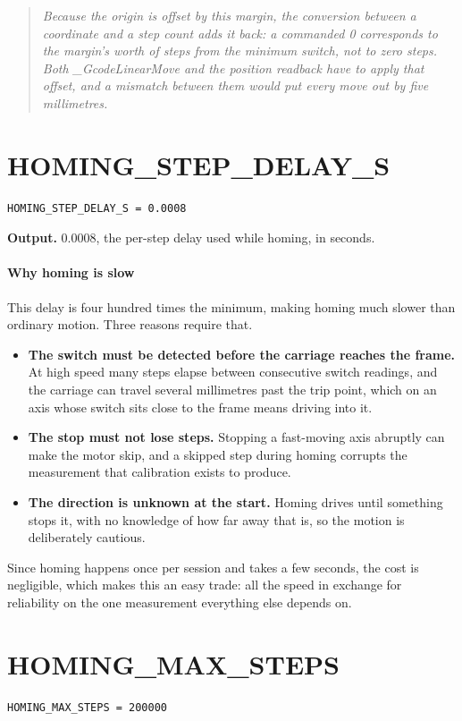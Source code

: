 \begin{quote}\small\itshape Because the origin is offset by this margin, the conversion between a coordinate and a step count adds it back: a commanded 0 corresponds to the margin's worth of steps from the minimum switch, not to zero steps. Both \_GcodeLinearMove and the position readback have to apply that offset, and a mismatch between them would put every move out by five millimetres.\end{quote}

\section{HOMING\_STEP\_DELAY\_S}
\begin{lstlisting}[style=sig]
HOMING_STEP_DELAY_S = 0.0008
\end{lstlisting}

\noindent\textbf{Output.} 0.0008, the per-step delay used while homing, in seconds.


\paragraph{Why homing is slow}
This delay is four hundred times the minimum, making homing much slower than ordinary motion. Three reasons require that.


\begin{itemize}\setlength\itemsep{0pt}
  \item \textbf{The switch must be detected before the carriage reaches the frame.} At high speed many steps elapse between consecutive switch readings, and the carriage can travel several millimetres past the trip point, which on an axis whose switch sits close to the frame means driving into it.
  \item \textbf{The stop must not lose steps.} Stopping a fast-moving axis abruptly can make the motor skip, and a skipped step during homing corrupts the measurement that calibration exists to produce.
  \item \textbf{The direction is unknown at the start.} Homing drives until something stops it, with no knowledge of how far away that is, so the motion is deliberately cautious.
\end{itemize}
Since homing happens once per session and takes a few seconds, the cost is negligible, which makes this an easy trade: all the speed in exchange for reliability on the one measurement everything else depends on.


\section{HOMING\_MAX\_STEPS}
\begin{lstlisting}[style=sig]
HOMING_MAX_STEPS = 200000
\end{lstlisting}

